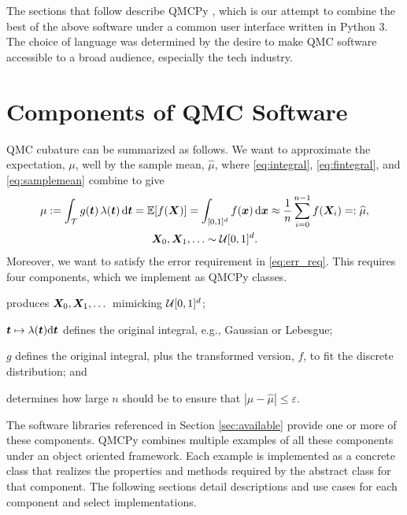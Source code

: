 \documentclass[graybox,footinfo]{svmult}
\newcommand{\QMCPYabs}[1]{\ensuremath{{\left \lvert #1 \right \rvert}}}
\newcommand{\hmu}{\widehat{\mu}}
\newcommand{\cube}{[0,1]^d}
\begin{document}
The sections that follow describe QMCPy \cite{QMCPy2020a}, which is our attempt to combine the best of the above software under a common user interface written in Python 3.  The choice of language was determined by the desire to make QMC software accessible to a broad audience, especially the tech industry.

\section{Components of QMC Software}
QMC cubature can be summarized as follows.  We want to approximate the expectation, $\mu$, well by the sample mean, $\hmu$, where \eqref{eq:integral}, \eqref{eq:fintegral}, and \eqref{eq:samplemean} combine to give
\begin{multline} \label{eq:cubSummary}
	\mu : = \int_\calT g(\bst) \, \lambda(\bst) \, \D \bst  = \bbE[f(\bsX)] = \int_{\cube} f(\bsx) \, \D \bsx \approx \frac 1n \sum_{i=0}^{n-1} f(\bsX_i) =: \hmu, \\
	 \bsX_0, \bsX_1, \ldots \sim \calU\cube.
\end{multline}
Moreover, we want to satisfy the error requirement in \eqref{eq:err_req}.
This requires four components, which we implement as QMCPy classes.

\begin{description}[format=\textup,format=\textbf]
	
	\item[Discrete Distribution]  produces ${\boldsymbol{X}}_0, {\boldsymbol{X}}_1, \dots$ mimicking ${\mathcal{U}}[0,1]^d$;
	
	\item[True Measure] ${\boldsymbol{t}} \mapsto \lambda ({\boldsymbol{t}}) \mathrm{d} {\boldsymbol{t}}$  defines the original integral, e.g., Gaussian or Lebesgue;
	
	\item[Integrand] $g$  defines the original integral, plus the transformed version, $f$, to fit the discrete distribution; and
	
	\item[Stopping Criterion] determines how large $n$ should be to ensure that $\QMCPYabs{\mu - \hmu} \le \varepsilon$.
\end{description}

The software libraries referenced in Section \ref{sec:available} provide one or more of these components. QMCPy combines multiple examples of all these components under an object oriented framework. Each example is implemented as a concrete class that realizes the properties and methods required by the abstract class for that component. The following sections detail descriptions and use cases for each component and select implementations. 
\end{document}

